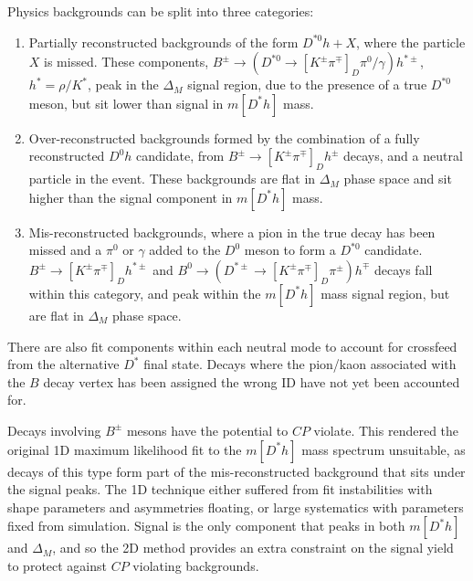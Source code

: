 \documentclass[oneside,12pt]{article}
\begin{document}
Physics backgrounds can be split into three categories:
\begin{enumerate}
	\item Partially reconstructed backgrounds of the form $D^{*0}h+X$, where the
particle $X$ is missed. These components, $B^{\pm}\rightarrow
(D^{*0}\rightarrow [K^{\pm}\pi^{\mp}]_D \pi^0/\gamma)h^{*\pm}$, $h^*=\rho/K^*$,
peak in the $\Delta_M$ signal region, due to the presence of a true $D^{*0}$
meson, but sit lower than signal in $m[D^*h]$ mass.
  \item Over-reconstructed backgrounds formed by the combination of a fully
	reconstructed $D^0h$ candidate, from $B^{\pm}\rightarrow
[K^{\pm}\pi^{\mp}]_Dh^{\pm}$ decays, and a neutral particle in the event.
These backgrounds are flat in $\Delta_M$ phase space and sit higher than the
signal component in $m[D^*h]$ mass.
  \item Mis-reconstructed backgrounds, where a pion in the true decay has been missed and
	a $\pi^0$ or $\gamma$ added to the $D^0$ meson to form a $D^{*0}$ candidate.
$B^{\pm}\rightarrow [K^{\pm}\pi^{\mp}]_Dh^{*\pm}$ and $B^{0}\rightarrow
(D^{*\pm}\rightarrow [K^{\pm}\pi^{\mp}]_D \pi^{\pm})h^{\mp}$ decays fall within
this category, and peak within the $m[D^*h]$ mass signal region, but are flat
in $\Delta_M$ phase space.
\end{enumerate}

There are also fit components within each neutral mode to account for
crossfeed from the alternative $D^*$ final state. Decays where the pion/kaon
associated with the $B$ decay vertex has been assigned the wrong ID have not yet
been accounted for.

Decays involving $B^{\pm}$ mesons have the potential to $CP$ violate. This
rendered the original 1D maximum likelihood fit to the $m[D^*h]$ mass spectrum
unsuitable, as decays of this type form part of the mis-reconstructed
background that sits under the signal peaks. The 1D technique either suffered
from fit instabilities with shape parameters and asymmetries floating, or large
systematics with parameters fixed from simulation. Signal is the only component
that peaks in both $m[D^*h]$ and $\Delta_M$, and so the 2D method provides an
extra constraint on the signal yield to protect against $CP$ violating
backgrounds.
\end{document}
